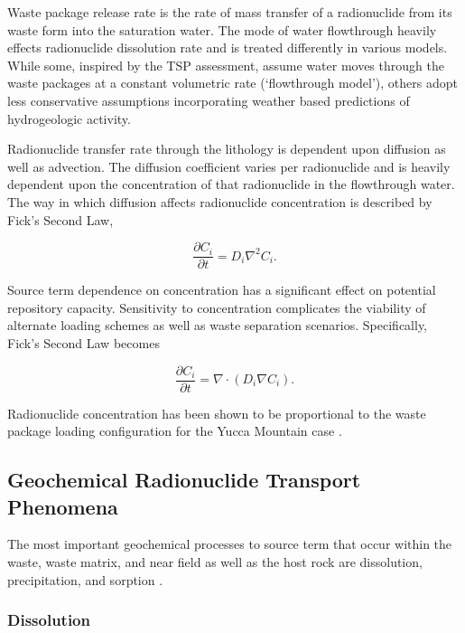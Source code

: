 Waste package release rate is the rate of mass transfer of a radionuclide from its
waste form into the saturation water. The mode of water flowthrough heavily
effects radionuclide dissolution rate and is treated differently in various models.
While some, inspired by the TSP assessment, assume water moves through the
waste packages at a constant volumetric rate (`flowthrough model'), others
adopt less conservative assumptions incorporating weather based predictions of
hydrogeologic activity.

Radionuclide transfer rate through the lithology is  dependent upon diffusion as
well as advection.  The diffusion coefficient varies per radionuclide and is heavily
dependent upon the concentration of that radionuclide in the flowthrough water.
The way in which diffusion affects radionuclide concentration is described by Fick's 
Second Law, 

\begin{equation} 
  \frac{\partial C_i}{\partial t}  = D_i\nabla^2 C_i.  
\end{equation}

Source term dependence on concentration has a significant effect on potential
repository capacity. Sensitivity to concentration complicates the viability of
alternate loading schemes as well as waste separation scenarios. Specifically, 
Fick's Second Law becomes 

\begin{equation} 
  \frac{\partial C_i}{\partial t}  = \nabla \cdot ( D_i \nabla C_i ). 
\end{equation}

Radionuclide concentration has been shown to be proportional to the waste package
loading configuration for the Yucca Mountain case
\cite{ahn_relationship_2002,kawasaki_congruent_2004}.


\subsection{Geochemical Radionuclide Transport Phenomena}

The most important geochemical processes to source term that occur within the
waste, waste matrix, and near field as well as the host rock are dissolution,
precipitation, and sorption \cite{bracke_safety_2008}. 

\subsubsection{Dissolution}

